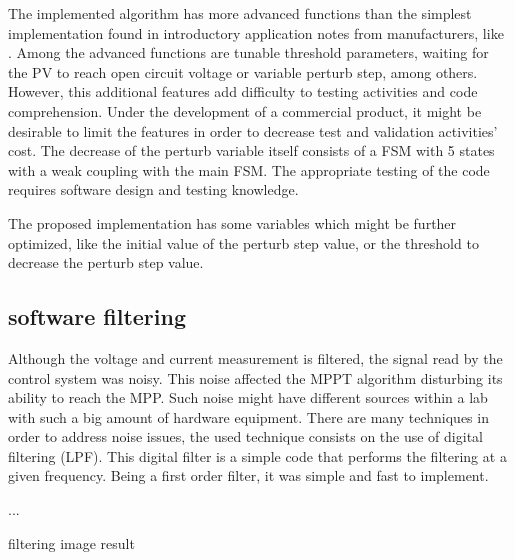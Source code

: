 The implemented algorithm has more advanced functions than the simplest implementation found in introductory application notes from manufacturers, like \cite{AN1521_MC}. Among the advanced functions are tunable threshold parameters, waiting for the PV to reach open circuit voltage or variable perturb step, among others. However, this additional features add difficulty to testing activities and code comprehension. Under the development of a commercial product, it might be desirable to limit the features in order to decrease test and validation activities' cost. The decrease of the perturb variable itself consists of a FSM with 5 states with a weak coupling with the main FSM. The appropriate testing of the code requires software design and testing knowledge.

The proposed implementation has some variables which might be further optimized, like the initial value of the perturb step value, or the threshold to decrease the perturb step value. 


\subsection{software filtering}
Although the voltage and current measurement is filtered, the signal read by the control system was noisy. This noise affected the MPPT algorithm disturbing its ability to reach the MPP. Such noise might have different sources within a lab with such a big amount of hardware equipment. There are many techniques in order to address noise issues, the used technique consists on the use of digital filtering (LPF). This digital filter is a  simple code that performs the filtering at a given frequency. Being a first order filter, it was simple and fast to implement. 


...

filtering image result








